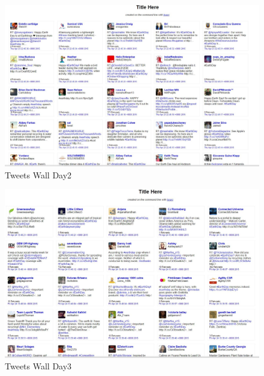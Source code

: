 \begin{figure}[ht]
	\begin{center}
		 \includegraphics[scale=0.40]{Day2Wall}
		  \caption{Tweets Wall Day2}
	 \end{center}
\end{figure}
\begin{figure}[ht]
	\begin{center}
		 \includegraphics[scale=0.40]{Day3Wall}
		  \caption{Tweets Wall Day3}
	 \end{center}
\end{figure}

